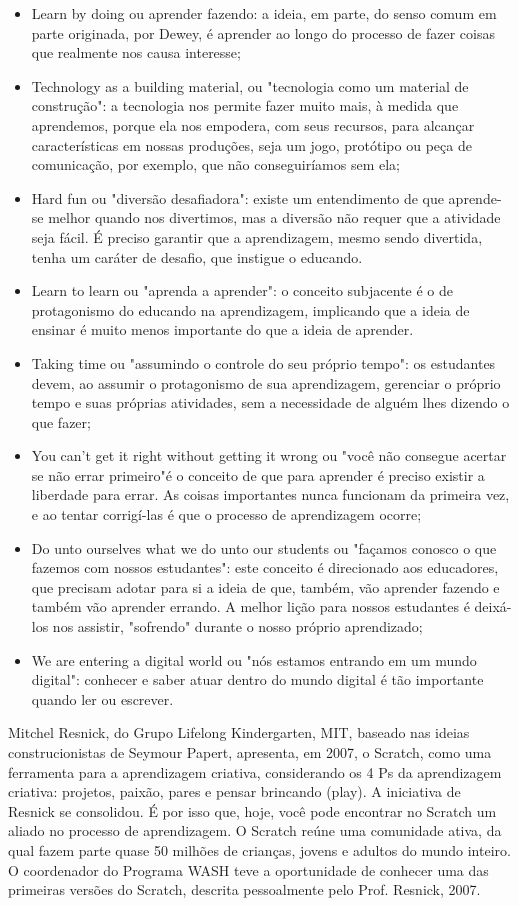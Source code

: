\begin{itemize}
\item Learn by doing ou aprender fazendo: a ideia, em parte,  do senso comum em parte originada, por Dewey, é aprender ao longo do processo de fazer coisas que realmente nos causa interesse;
\item Technology as a building material, ou "tecnologia como um material de construção": a tecnologia nos permite fazer muito mais, à medida que aprendemos, porque ela nos empodera, com seus recursos, para alcançar características em nossas produções, seja um jogo, protótipo ou peça de comunicação, por exemplo, que não conseguiríamos sem ela;
\item Hard fun ou "diversão desafiadora": existe um entendimento de que aprende-se melhor quando nos divertimos, mas a diversão não requer que a atividade seja fácil. É preciso garantir que a aprendizagem, mesmo sendo divertida, tenha um caráter de desafio, que instigue o educando.
\item Learn to learn ou "aprenda a aprender": o conceito subjacente é o de protagonismo do educando na aprendizagem, implicando que a ideia de ensinar é muito menos importante do que a ideia de aprender.
\item Taking time ou "assumindo o controle do seu próprio tempo": os estudantes devem, ao assumir o protagonismo de sua aprendizagem, gerenciar o próprio tempo e suas próprias atividades, sem a necessidade de alguém lhes dizendo o que fazer;
\item You can’t get it right without getting it wrong ou "você não consegue acertar
se não errar primeiro"é o conceito de que para aprender é preciso existir a
liberdade para errar. As coisas importantes nunca funcionam da primeira vez, e ao tentar corrigí-las é que o processo de aprendizagem ocorre;
\item Do unto ourselves what we do unto our students ou "façamos conosco o que fazemos com nossos estudantes": este conceito é direcionado aos educadores, que precisam adotar para si a ideia de que, também, vão aprender fazendo e também vão aprender errando. A melhor lição para nossos estudantes é deixá-los nos assistir, "sofrendo" durante o nosso próprio aprendizado;
\item We are entering a digital world ou "nós estamos entrando em um mundo digital": conhecer e saber atuar dentro do mundo digital é tão importante quando ler ou escrever.
\end{itemize}

Mitchel Resnick, do Grupo Lifelong Kindergarten, MIT, baseado nas ideias construcionistas de Seymour Papert, apresenta, em 2007, o Scratch, como uma ferramenta para a aprendizagem criativa, considerando os 4 Ps da aprendizagem criativa: projetos, paixão, pares e pensar brincando (play). A iniciativa de Resnick se consolidou. É por isso que, hoje, você pode encontrar no Scratch um aliado no processo de aprendizagem. O Scratch reúne uma comunidade ativa, da qual fazem parte quase 50 milhões de crianças, jovens e adultos do mundo inteiro. O coordenador do Programa WASH teve a oportunidade de conhecer uma das primeiras versões do Scratch, descrita pessoalmente pelo Prof. Resnick, 2007.

